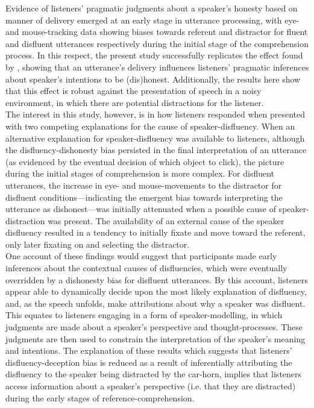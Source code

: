 \documentclass[man]{apa6}
\begin{document}
Evidence of listeners' pragmatic judgments about a speaker's honesty based on manner of delivery emerged at an early stage in utterance processing, with eye- and mouse-tracking data showing biases towards referent and distractor for fluent and disfluent utterances respectively during the initial stage of the comprehension process. 
In this respect, the present study successfully replicates the effect found by \citet{Loy2016}, showing that an utterance's delivery influences listeners' pragmatic inferences about speaker's intentions to be (dis)honest. 
Additionally, the results here show that this effect is robust against the presentation of speech in a noisy environment, in which there are potential distractions for the listener. 
\\

The interest in this study, however, is in how listeners responded when presented with two competing explanations for the cause of speaker-disfluency. 
When an alternative explanation for speaker-disfluency was available to listeners, although the disfluency-dishonesty bias persisted in the final interpretation of an utterance (as evidenced by the eventual decision of which object to click), the picture during the initial stages of comprehension is more complex. 
For disfluent utterances, the increase in eye- and mouse-movements to the distractor for disfluent conditions---indicating the emergent bias towards interpreting the utterance as dishonest---was initially attenuated when a possible cause of speaker-distraction was present. 
The availability of an external cause of the speaker disfluency resulted in a tendency to initially fixate and move toward the referent, only later fixating on and selecting the distractor. \\

One account of these findings would suggest that participants made early inferences about the contextual causes of disfluencies, which were eventually overridden by a dishonesty bias for disfluent utterances. 
By this account, listeners appear able to dynamically decide upon the most likely explanation of disfluency, and, as the speech unfolds, make attributions about why a speaker was disfluent. 
This equates to listeners engaging in a form of speaker-modelling, in which judgments are made about a speaker's perspective and thought-processes. 
These judgments are then used to constrain the interpretation of the speaker's meaning and intentions.
The explanation of these results which suggests that listeners' disfluency-deception bias is reduced as a result of inferentially attributing the disfluency to the speaker being distracted by the car-horn, implies that listeners access information about a speaker's perspective (i.e. that they are distracted) during the early stages of reference-comprehension. 
\end{document}
